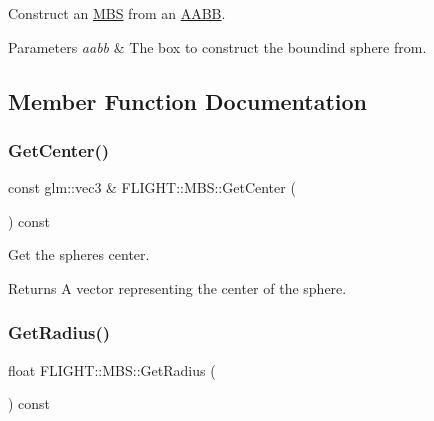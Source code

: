 Construct an \hyperlink{class_f_l_i_g_h_t_1_1_m_b_s}{M\+BS} from an \hyperlink{class_f_l_i_g_h_t_1_1_a_a_b_b}{A\+A\+BB}. 


\begin{DoxyParams}{Parameters}
{\em aabb} & The box to construct the boundind sphere from. \\
\hline
\end{DoxyParams}


\subsection{Member Function Documentation}
\mbox{\label{class_f_l_i_g_h_t_1_1_m_b_s_a6c2f43b25ba2e362cbdcf1ce528ba68a}} 
\subsubsection{\texorpdfstring{Get\+Center()}{GetCenter()}}
{\footnotesize\ttfamily const glm\+::vec3 \& F\+L\+I\+G\+H\+T\+::\+M\+B\+S\+::\+Get\+Center (\begin{DoxyParamCaption}{ }\end{DoxyParamCaption}) const}



Get the sphere\textquotesingle{}s center. 

\begin{DoxyReturn}{Returns}
A vector representing the center of the sphere. 
\end{DoxyReturn}
\mbox{\label{class_f_l_i_g_h_t_1_1_m_b_s_a23ede2b9770a4fe82e0cfc3ce2a9e28c}} 
\subsubsection{\texorpdfstring{Get\+Radius()}{GetRadius()}}
{\footnotesize\ttfamily float F\+L\+I\+G\+H\+T\+::\+M\+B\+S\+::\+Get\+Radius (\begin{DoxyParamCaption}{ }\end{DoxyParamCaption}) const}



